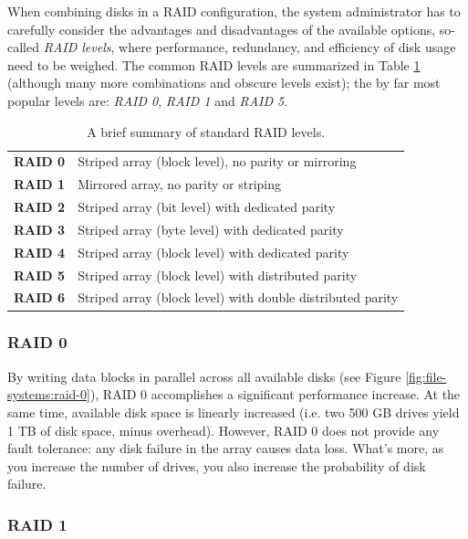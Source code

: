 When combining disks in a RAID configuration, the
system administrator has to carefully consider the
advantages and disadvantages of the available options,
so-called {\em RAID levels}, where performance,
redundancy, and efficiency of disk usage need to be
weighed.  The common RAID levels are summarized in
Table \ref{table:file systems:raid-std} (although many
more combinations and obscure levels exist); the by
far most popular levels are: {\em RAID 0}, {\em RAID
1} and {\em RAID 5}.

\begin{table}[ht]
\centering
	\begin{tabular}{ l p{}}
	\hline
	{\bf RAID 0} & Striped array (block level), no parity or mirroring \\
	{\bf RAID 1} & Mirrored array, no parity or striping \\
	{\bf RAID 2} & Striped array (bit level) with dedicated parity \\
	{\bf RAID 3} & Striped array (byte level) with dedicated parity \\
	{\bf RAID 4} & Striped array (block level) with dedicated parity \\
	{\bf RAID 5} & Striped array (block level) with distributed parity \\
	{\bf RAID 6} & Striped array (block level) with double distributed parity \\
	\hline
	\end{tabular}
	\caption{A brief summary of standard RAID levels.}
	\label{table:file systems:raid-std}
\end{table}


\subsubsection{RAID 0}

By writing data blocks in parallel across all
available disks (see Figure
\ref{fig:file-systems:raid-0}), RAID 0 accomplishes a
significant performance increase.  At the same time,
available disk space is linearly increased (i.e. two
500 GB drives yield 1 TB of disk space, minus
overhead).  However, RAID 0 does not provide any fault
tolerance: any disk failure in the array causes data
loss.  What's more, as you increase the number of
drives, you also increase the probability of disk
failure.

\subsubsection{RAID 1}

